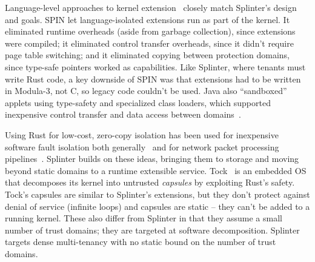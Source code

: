 Language-level approaches to kernel extension~\cite{spin,singularity} closely
match Splinter's design and goals. SPIN let language-isolated extensions run
as part of the kernel. It eliminated runtime overheads (aside from garbage
collection), since extensions were compiled; it eliminated control transfer
overheads, since it didn't require page table switching; and it eliminated
copying between protection domains, since type-safe pointers worked as
capabilities.
Like Splinter, where tenants must write Rust code, a
key downside of SPIN was that extensions had
to be written in Modula-3, not C, so legacy code couldn't be used.
%
Java also ``sandboxed'' applets using type-safety and specialized class
loaders, which supported inexpensive control transfer and data access between
domains~\cite{extensible-java}.

Using Rust for low-cost, zero-copy isolation has been used for inexpensive
  software fault isolation both generally~\cite{rust-hotos-2016} and for
  network packet processing pipelines~\cite{netbricks-2016}.
Splinter builds on these ideas, bringing them to storage and moving beyond
  static domains to a runtime extensible service.
Tock~\cite{tockos-2017} is an embedded OS that decomposes its kernel into
  untrusted \textsl{capsules} by exploiting Rust's safety. Tock's capsules
  are similar to Splinter's extensions, but they don't protect against denial of
  service (infinite loops) and capsules are static -- they can't be added to a running kernel.
These also differ from Splinter in that they assume a small number of trust
  domains; they are targeted at software decomposition.
Splinter targets dense multi-tenancy with no static
  bound on the number of trust domains.


